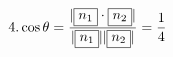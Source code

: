 \documentclass[preview]{standalone}
\begin{document}
\begin{align*}
\special{dvisvgm:raw <g id='unique000'>}4. \cos\theta=\frac{|\boxed{n_1}\cdot\boxed{n_2}|}{|\boxed{n_1}||\boxed{n_2}|}=\frac{1}{4}\special{dvisvgm:raw </g>}
\end{align*}
\end{document}
